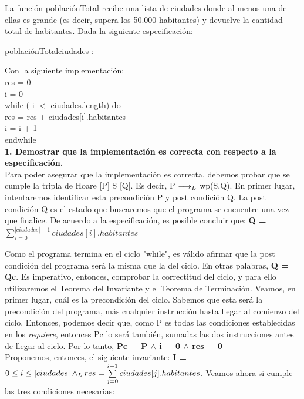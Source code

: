 \documentclass[10pt,a4paper]{article}
\begin{document}

La función poblaciónTotal recibe una lista de ciudades donde al menos una de ellas es grande (es decir, supera los 50.000 habitantes) y devuelve la cantidad total de habitantes. Dada la siguiente especificación:

\begin{proc}{poblaciónTotal}{\In ciudades : \TLista{\str\times\ent}}{\ent}
\end{proc}
Con la siguiente implementación:\\

res = 0\\
i = 0\\
while ( i $<$ ciudades.length) do\\
res = res + ciudades[i].habitantes\\
i = i + 1\\
endwhile\\

\textbf{1. Demostrar que la implementación es correcta con respecto a la especificación.}\\

Para poder asegurar que la implementación es correcta, debemos probar que se cumple la tripla de Hoare [P] S [Q]. Es decir, P $\longrightarrow _L$ wp(S,Q). En primer lugar, intentaremos identificar esta precondición P y post condición Q.
La post condición Q es el estado que buscaremos que el programa se encuentre una vez que finalice. De acuerdo a la especificación, es posible concluir que:
\textbf{{Q = ${\sum\limits_{i=0}^{|ciudades| - 1}ciudades[i].habitantes}$}}

Como el programa termina en el ciclo "while", es válido afirmar que la post condición del programa será la misma que la del ciclo. En otras palabras, \textbf{Q = Qc}. Es imperativo, entonces, comprobar la correctitud del ciclo, y para ello utilizaremos el Teorema del Invariante y el Teorema de Terminación.
Veamos, en primer lugar, cuál es la precondición del ciclo. Sabemos que esta será la precondición del programa, más cualquier instrucción hasta llegar al comienzo del ciclo. Entonces, podemos decir que, como P es todas las condiciones establecidas en los \textit{requiere}, entonces Pc lo será también, sumadas las dos instrucciones antes de llegar al ciclo. Por lo tanto, \textbf{Pc = P $\wedge$ i = 0 $\wedge$ res = 0}\\
    Proponemos, entonces, el siguiente invariante: \textbf{I = $0 \leq i \leq |ciudades| \land _L res = \sum\limits_{j=0}^{i - 1}ciudades[j].habitantes$}. Veamos ahora si cumple las tres condiciones necesarias: \\
    
\end{document}
